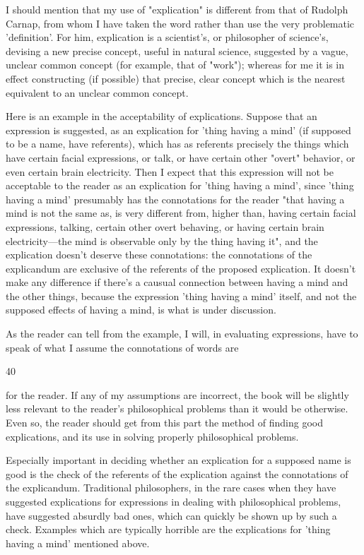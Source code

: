 \documentclass[10pt,twoside]{memoir}
\begin{document}
\begin{enumerate}
{{{{{{I should mention that my use of "explication" is different from that of 
Rudolph Carnap, from whom I have taken the word rather than use the very 
problematic 'definition'. For him, explication is a scientist's, or philosopher 
of science's, devising a new precise concept, useful in natural science, 
suggested by a vague, unclear common concept (for example, that of 
"work"); whereas for me it is in effect constructing (if possible) that precise, 
clear concept which is the nearest equivalent to an unclear common concept. 

Here is an example in the acceptability of explications. Suppose that an 
expression is suggested, as an explication for 'thing having a mind' (if 
supposed to be a name, have referents), which has as referents precisely the 
things which have certain facial expressions, or talk, or have certain other 
"overt" behavior, or even certain brain electricity. Then I expect that this 
expression will not be acceptable to the reader as an explication for 'thing 
having a mind', since 'thing having a mind' presumably has the connotations 
for the reader "that having a mind is not the same as, is very different from, 
higher than, having certain facial expressions, talking, certain other overt 
behaving, or having certain brain electricity---the mind is observable only by 
the thing having it", and the explication doesn't deserve these connotations: 
the connotations of the explicandum are exclusive of the referents of the 
proposed explication. It doesn't make any difference if there's a causual 
connection between having a mind and the other things, because the 
expression 'thing having a mind' itself, and not the supposed effects of 
having a mind, is what is under discussion. 

As the reader can tell from the example, I will, in evaluating 
expressions, have to speak of what I assume the connotations of words are 


40 


for the reader. If any of my assumptions are incorrect, the book will be 
slightly less relevant to the reader's philosophical problems than it would be 
otherwise. Even so, the reader should get from this part the method of 
finding good explications, and its use in solving properly philosophical 
problems. 

Especially important in deciding whether an explication for a supposed 
name is good is the check of the referents of the explication against the 
connotations of the explicandum. Traditional philosophers, in the rare cases 
when they have suggested explications for expressions in dealing with 
philosophical problems, have suggested absurdly bad ones, which can quickly 
be shown up by such a check. Examples which are typically horrible are the 
explications for 'thing having a mind' mentioned above. 

}}}}}}
\end{enumerate}
\end{document}
